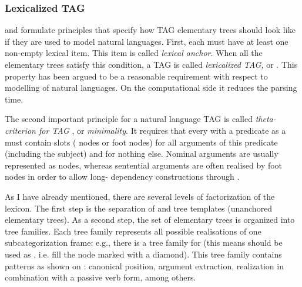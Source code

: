 \subsubsection{Lexicalized TAG} 
\citet{Abeille:02} and \cite{Frank:02} formulate principles that specify how TAG elementary trees should look like if they are used to model natural languages. First, each  must have at least one non-empty lexical item. This item is called \textit{lexical anchor}. When all the elementary trees satisfy this condition, a TAG is called \textit{lexicalized TAG,} or . This property has been argued to be a reasonable requirement with respect to modelling of natural languages. On the computational side it reduces the parsing time. 

The second important principle for a natural language TAG is called \textit{theta-criterion for TAG} \citep{Frank:92}, or \textit{ minimality}. It requires that every  with a predicate as a  must contain slots ( nodes or foot nodes) for all arguments of this predicate (including the subject) and for nothing else. Nominal arguments are usually represented as  nodes, whereas sentential arguments are often realised by foot nodes in order to allow long- dependency constructions through   \citep{Kroch:89, Frank:02}.


As I have already mentioned, there are several levels of factorization of the  lexicon. The first step is the separation of  and tree templates (unanchored elementary trees). As a second step, the set of elementary trees is organized into tree families. Each tree family represents all possible realisations of one subcategorization frame: e.g., there is a tree family for  (this means  should be used as , i.e. fill the node marked with a diamond). This tree family contains patterns as shown on : canonical position, argument extraction, realization in combination with a passive verb form, among others.


